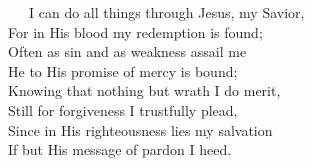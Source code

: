 \documentclass[
]{book}
\begin{document}
~~~I can do all things through Jesus, my Savior,\\
\hspace*{0.333em}\hspace*{0.333em}\hspace*{0.333em}For in His blood my redemption is found;\\
\hspace*{0.333em}\hspace*{0.333em}\hspace*{0.333em}Often as sin and as weakness assail me\\
\hspace*{0.333em}\hspace*{0.333em}\hspace*{0.333em}He to His promise of mercy is bound;\\
\hspace*{0.333em}\hspace*{0.333em}\hspace*{0.333em}Knowing that nothing but wrath I do merit,\\
\hspace*{0.333em}\hspace*{0.333em}\hspace*{0.333em}Still for forgiveness I trustfully plead,\\
\hspace*{0.333em}\hspace*{0.333em}\hspace*{0.333em}Since in His righteousness lies my salvation\\
\hspace*{0.333em}\hspace*{0.333em}\hspace*{0.333em}If but His message of pardon I heed.
\end{document}
